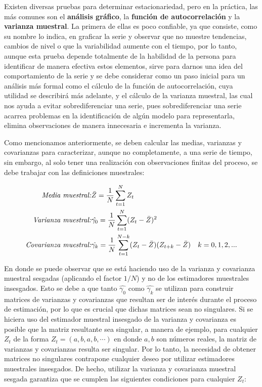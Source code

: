 Existen diversas pruebas para determinar estacionariedad, pero en la práctica, las más comunes son el \textbf{análisis gráfico}, la \textbf{función de autocorrelación} y la \textbf{varianza muestral}. La primera de ellas es poco confiable, ya que consiste, como su nombre lo indica, en graficar la serie y observar que no muestre tendencias, cambios de nivel o que la variabilidad aumente con el tiempo, por lo tanto, aunque esta prueba depende totalmente de la habilidad de la persona para identificar de manera efectiva estos elementos, sirve para darnos una idea del comportamiento de la serie y se debe considerar como un paso inicial para un análisis más formal como el cálculo de la función de autocorrelación, cuya utilidad se describirá más adelante, y el cálculo de la varianza muestral, las cual nos ayuda a evitar sobrediferenciar una serie, pues sobrediferenciar una serie acarrea problemas en la identificación de algún modelo para representarla, elimina observaciones de manera innecesaria e incrementa la varianza.\newline

Como mencionamos anteriormente, se deben calcular las medias, varianzas y covarianzas para caracterizar, aunque no completamente, a una serie de tiempo, sin embargo, al solo tener una realización con observaciones finitas del proceso, se debe trabajar con las definiciones muestrales:\newline


\begin{eqnarray}
        \mbox{\emph{Media muestral:}} & \bar{Z} =\frac{1}{N} \sum_{t=1}^{N}{Z_t} &  \nonumber \\ 
        \mbox{\emph{Varianza muestral:}}  & \hat{\gamma_0}=\frac{1}{N} \sum_{t=1}^{N}(Z_t- \bar{Z} )^2 & \\ 
        \mbox{\emph{Covarianza muestral:}} & \hat{\gamma_k}=\frac{1}{N} \sum_{t=1}^{N-k}(Z_t-\bar{Z})(Z_{t+k}-\bar{Z})  & k=0,1,2,...  \nonumber
\end{eqnarray} 

En donde se puede observar que se está haciendo uso de la varianza y covarianza muestral sesgadas (aplicando el factor $1/N$) y no de los estimadores muestrales insesgados.  Esto se debe a que tanto $\hat{\gamma_0}$ como $\hat{\gamma_k}$ se utilizan para construir matrices de varianzas y covarianzas que resultan ser de interés durante el proceso de estimación, por lo que es crucial que dichas matrices sean no singulares. Si se hiciera uso del estimador muestral insesgado de la varianza y covarianza es posible que la matriz resultante sea singular, a manera de ejemplo, para cualquier $Z_t$ de la forma $Z_t=(a,b,a,b,\cdots)$ en donde $a,b$ son números reales, la matriz de varianzas y covarianzas resulta ser singular. Por lo tanto, la necesidad de obtener matrices no singulares contrapone cualquier deseo por utilizar estimadores muestrales insesgados. De hecho, utilizar la varianza y covarianza muestral sesgada garantiza que se cumplen las siguientes condiciones para cualquier $Z_t$:

